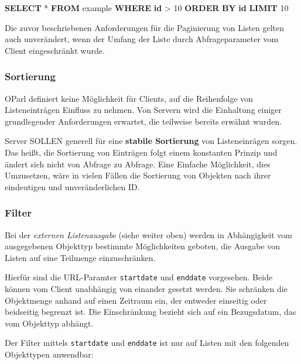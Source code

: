 \documentclass[,a4paper]{article}
\newenvironment{Shaded}{}{}
\newcommand{\KeywordTok}[1]{\textcolor[rgb]{0.00,0.44,0.13}{\textbf{{#1}}}}
\newcommand{\DecValTok}[1]{\textcolor[rgb]{0.25,0.63,0.44}{{#1}}}
\newcommand{\NormalTok}[1]{{#1}}
\begin{document}
\begin{Shaded}
\begin{Highlighting}[]
\KeywordTok{SELECT} \NormalTok{* }\KeywordTok{FROM} \NormalTok{example }\KeywordTok{WHERE} \KeywordTok{id} \NormalTok{> }\DecValTok{10} \KeywordTok{ORDER} \KeywordTok{BY} \KeywordTok{id} \KeywordTok{LIMIT} \DecValTok{10}
\end{Highlighting}
\end{Shaded}

Die zuvor beschriebenen Anforderungen für die Paginierung von Listen
gelten auch unverändert, wenn der Umfang der Liste durch
Abfrageparameter vom Client eingeschränkt wurde.

\subsubsection{Sortierung}\label{sortierung}

OParl definiert keine Möglichkeit für Clients, auf die Reihenfolge von
Listeneinträgen Einfluss zu nehmen. Von Servern wird die Einhaltung
einiger grundlegender Anforderungen erwartet, die teilweise bereits
erwähnt wurden.

Server SOLLEN generell für eine \textbf{stabile Sortierung} von
Listeneinrägen sorgen. Das heißt, die Sortierung von Einträgen folgt
einem konstanten Prinzip und ändert sich nicht von Abfrage zu Abfrage.
Eine Einfache Möglichkeit, dies Umzusetzen, wäre in vielen Fällen die
Sortierung von Objekten nach ihrer eindeutigen und unveränderlichen ID.

\subsubsection{Filter}\label{filter}

Bei der \emph{externen Listenausgabe} (siehe weiter oben) werden in
Abhängigkeit vom ausgegebenen Objekttyp bestimmte Möglichkeiten geboten,
die Ausgabe von Listen auf eine Teilmenge einzuschränken.

Hierfür sind die URL-Paramter \texttt{startdate} und \texttt{enddate}
vorgesehen. Beide können vom Client unabhängig von einander gesetzt
werden. Sie schränken die Objektmenge anhand auf einen Zeitraum ein, der
entweder einseitig oder beidseitig begrenzt ist. Die Einschränkung
bezieht sich auf ein Bezugsdatum, das vom Objekttyp abhängt.

Der Filter mittels \texttt{startdate} und \texttt{enddate} ist nur auf
Listen mit den folgenden Objekttypen anwendbar:
\end{document}
